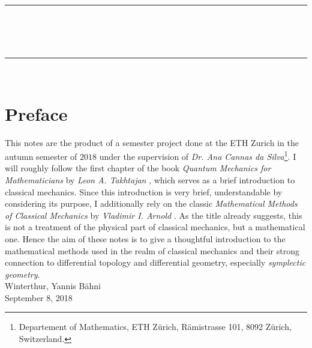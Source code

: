 



\frontmatter

\renewcommand*{\thefootnote}{\fnsymbol{footnote}}

\thispagestyle{empty}

\begin{center}
    \rule{\linewidth}{1mm}\\
	\\
	\\
	\rule{\linewidth}{1mm} \\[.5cm]
\end{center}
\clearpage

\chapter*{Preface}
This notes are the product of a semester project done at the ETH Zurich in the autumn semester of $2018$ under the supervision of \emph{Dr. Ana Cannas da Silva}\footnote{Departement of Mathematics, ETH Z\"urich, R\"amistrasse 101, 8092 Z\"urich, Switzerland.}. I will roughly follow the first chapter of the book \emph{Quantum Mechanics for Mathematicians} by \emph{Leon A. Takhtajan} \cite{takhtajan:QM:2008}, which serves as a brief introduction to classical mechanics. Since this introduction is very brief, understandable by considering its purpose, I additionally rely on the classic \emph{Mathematical Methods of Classical Mechanics} by \emph{Vladimir I. Arnold} \cite{arnold:CM:1989}. As the title already suggests, this is not a treatment of the physical part of classical mechanics, but a mathematical one. Hence the aim of these notes is to give a thoughtful introduction to the mathematical methods used in the realm of classical mechanics and their strong connection to differential topology and differential geometry, especially \emph{symplectic geometry}.
\newline\\
\noindent Winterthur, \hfill Yannis B\"ahni\\
September 8, 2018
\tableofcontents

\mainmatter

\renewcommand*{\thefootnote}{\arabic{footnote}}




\appendix


